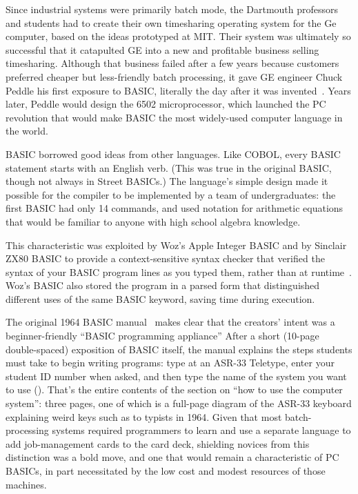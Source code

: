 Since industrial systems were primarily batch mode, the Dartmouth
professors and students had to create  their own timesharing operating
system for the Ge computer, based on the ideas prototyped at MIT.  Their
system was ultimately so successful that it catapulted GE into a new
and profitable business selling timesharing.
Although that business failed after a few
years because customers preferred cheaper but less-friendly batch
processing, it gave GE engineer Chuck Peddle his
first exposure to BASIC, literally the day after it was
invented~\cite[p.~5]{commodore}.  Years later, Peddle would design the
6502 microprocessor, which launched the PC revolution that would make
BASIC the most widely-used computer language in the world.

BASIC borrowed good ideas from other languages.  Like COBOL, every BASIC
statement starts with an English verb.  (This was true in the original
BASIC, though not always in Street BASICs.)  The language's simple
design made it possible for the compiler to be implemented by a team of
undergraduates: the first BASIC had only 14 commands, and used notation
for arithmetic 
equations that would be familiar to anyone with high school algebra knowledge.


  \begin{geeknote}
   This characteristic was exploited by Woz's Apple Integer BASIC and by
   Sinclair ZX80 BASIC to 
    provide a context-sensitive syntax checker that verified the syntax
    of your BASIC program lines as you typed them, rather than at
    runtime~\cite{zx80_basic_techreport}.  Woz's BASIC also stored the
    program in a parsed form that distinguished different uses of the
    same BASIC keyword, saving time during execution.
  \end{geeknote}

The original 1964 BASIC manual~\cite[p. 14]{dartmouth_basic_manual}
makes clear that the
creators' intent was a beginner-friendly ``BASIC programming appliance'' 
After a short (10-page double-spaced) exposition of BASIC itself, the
manual explains the steps students must take to begin writing programs: 
type  at an ASR-33
Teletype, enter your student ID number when asked, 
and then type the name of the system you want to use ().
That's the entire contents of the section on ``how to use the computer
system'': three pages, one of which is a full-page diagram of the ASR-33
keyboard 
explaining weird keys such as  to typists in 1964.
Given that most batch-processing systems required programmers to
learn and use a 
separate  language to add 
job-management cards to the card deck, shielding novices from this
distinction was a bold move, and one that would remain a characteristic of
PC BASICs, in part necessitated by the low cost and
modest resources of those machines.

